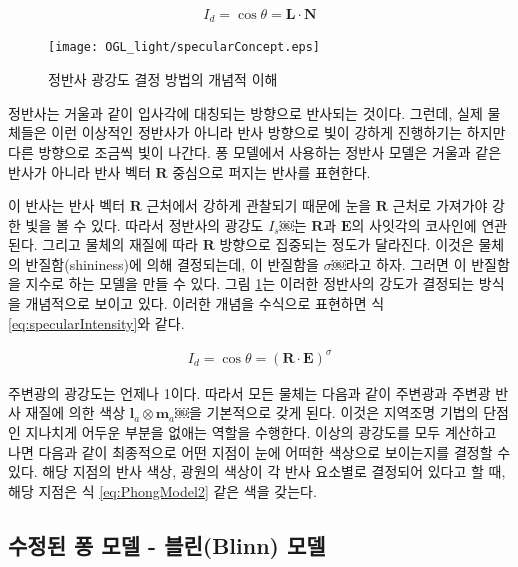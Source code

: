 \begin{eqnarray}
\label{eq:diffuseIntensity}
I_d  =  \cos \theta   = \mathbf L \cdot \mathbf N
\end{eqnarray}


\begin{figure}[h!]
  \centering
    \texttt{[image: OGL\_light/specularConcept.eps]}
    \caption{정반사 광강도 결정 방법의 개념적 이해}
    \label{fig:OGL_light:specularConcept}
\end{figure}

정반사는 거울과 같이 입사각에 대칭되는 방향으로 반사되는 것이다. 그런데, 실제 물체들은 이런 이상적인 정반사가 아니라 반사 방향으로 빛이 강하게 진행하기는 하지만 다른 방향으로 조금씩 빛이 나간다. 퐁 모델에서 사용하는 정반사 모델은 거울과 같은 반사가 아니라 반사 벡터 $\mathbf R$ 중심으로 퍼지는 반사를 표현한다.

이 반사는 반사 벡터 $\mathbf R$ 근처에서 강하게 관찰되기 때문에 눈을  $\mathbf R$ 근처로 가져가야 강한 빛을 볼 수 있다. 
따라서 정반사의 광강도 $I_s$￼는 $\mathbf R$과 
$\mathbf E$의 사잇각의 코사인에 연관된다. 그리고 물체의 재질에 따라 $\mathbf R$ 방향으로 집중되는 정도가 달라진다. 
이것은 물체의 반질함(shininess)에 의해 결정되는데, 이 반질함을 $\sigma$￼라고 하자. 
그러면 이 반질함을 지수로 하는 모델을 만들 수 있다. 
그림 \ref{fig:OGL_light:specularConcept}는 이러한 정반사의 강도가 결정되는 방식을 개념적으로 보이고 있다.
이러한 개념을 수식으로 표현하면 식 \ref{eq:specularIntensity}와 같다.

\begin{eqnarray}
\label{eq:specularIntensity}
I_d  = \cos \theta =  (\mathbf R \cdot \mathbf E )^\sigma
\end{eqnarray}

주변광의 광강도는 언제나 1이다. 따라서 모든 물체는 다음과 같이 주변광과 주변광 반사 재질에 의한 색상
$\mathbf l_a \otimes \mathbf m_a$￼을 기본적으로 갖게 된다.  이것은 지역조명 기법의 단점인 지나치게 어두운 부분을 없애는 역할을 수행한다.
이상의 광강도를 모두 계산하고 나면 다음과 같이 최종적으로 어떤 지점이 눈에 어떠한 색상으로 보이는지를 결정할 수 있다. 해당 지점의 반사 색상, 
광원의 색상이 각 반사 요소별로 결정되어 있다고 할 때, 해당 지점은 식 \ref{eq:PhongModel2} 같은 색을 갖는다.

\subsection{수정된 퐁 모델 - 블린(Blinn) 모델}

